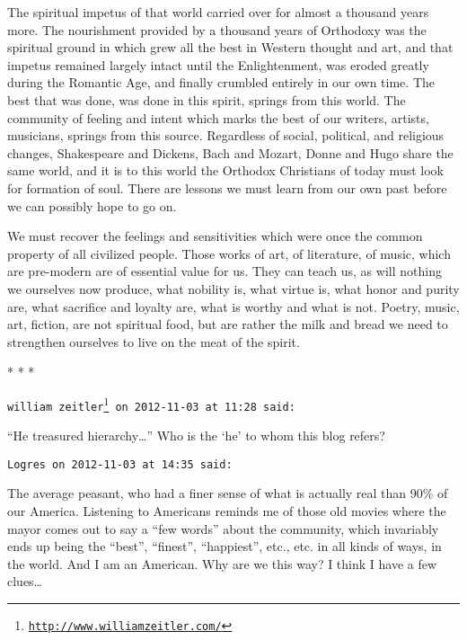 The spiritual impetus of that world carried over for almost a thousand years more. The nourishment provided by a thousand years of Orthodoxy was the spiritual ground in which grew all the best in Western thought and art, and that impetus remained largely intact until the Enlightenment, was eroded greatly during the Romantic Age, and finally crumbled entirely in our own time. The best that was done, was done in this spirit, springs from this world. The community of feeling and intent which marks the best of our writers, artists, musicians, springs from this source. Regardless of social, political, and religious changes, Shakespeare and Dickens, Bach and Mozart, Donne and Hugo share the same world, and it is to this world the Orthodox Christians of today must look for formation of soul. There are lessons we must learn from our own past before we can possibly hope to go on.

We must recover the feelings and sensitivities which were once the common property of all civilized people. Those works of art, of literature, of music, which are pre-modern are of essential value for us. They can teach us, as will nothing we ourselves now produce, what nobility is, what virtue is, what honor and purity are, what sacrifice and loyalty are, what is worthy and what is not. Poetry, music, art, fiction, are not spiritual food, but are rather the milk and bread we need to strengthen ourselves to live on the meat of the spirit.




\begin{center}* * *\end{center}

\begin{footnotesize}\begin{sffamily}

\texttt{william zeitler\footnote{\url{http://www.williamzeitler.com/}} on 2012-11-03 at 11:28 said: }

“He treasured hierarchy…” Who is the `he' to whom this blog refers?



\texttt{Logres on 2012-11-03 at 14:35 said: }

The average peasant, who had a finer sense of what is actually real than 90\% of our America. Listening to Americans reminds me of those old movies where the mayor comes out to say a “few words” about the community, which invariably ends up being the “best”, “finest”, “happiest”, etc., etc. in all kinds of ways, in the world. And I am an American. Why are we this way? I think I have a few clues…


\hfill


\end{sffamily}\end{footnotesize}
